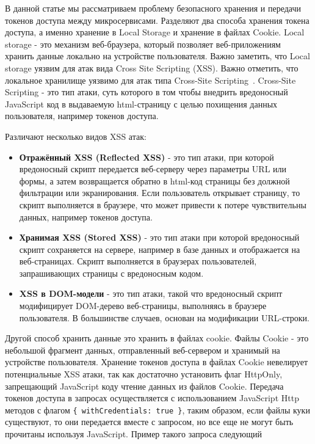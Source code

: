 В данной статье мы рассматриваем проблему безопасного хранения и передачи токенов доступа между микросервисами.
Разделяют два способа хранения токена доступа, а именно хранение в Local Storage и хранение в файлах Cookie.
Local storage - это механизм веб-браузера, который позволяет веб-приложениям хранить данные локально
на устройстве пользователя.
Важно заметить, что Local storage уязвим для атак вида Cross Site Scripting (XSS).
Важно отметить, что локальное хранилище уязвимо для атак типа Cross-Site Scripting~\cite{spett2005cross}.
Cross-Site Scripting - это тип атаки, суть которого в том чтобы внедрить вредоносный JavaScript код
в выдаваемую html-страницу с целью похищения данных пользователя, например токенов доступа.

Различают несколько видов XSS атак:
\begin{itemize}
    \item \textbf{Отражённый XSS (Reflected XSS)} - это тип атаки, при которой вредоносный
    скрипт передается веб-серверу через параметры URL или формы, а затем возвращается обратно в html-код страницы
    без должной фильтрации или экранирования.
    Если пользователь открывает страницу, то скрипт выполняется в браузере, что может привести к потере чувствительны данных, например токенов доступа.
    \item \textbf{Хранимая XSS (Stored XSS)} - это тип атаки при которой вредоносный скрипт сохраняется на сервере, например
    в базе данных и отображается на веб-страницах.
    Скрипт выполняется в браузерах пользователей, запрашивающих страницы с вредоносным кодом.
    \item \textbf{XSS в DOM-модели} - это тип атаки, такой что вредоносный скрипт модифицирует DOM-дерево веб-страницы,
    выполняясь в браузере пользователя.
    В большинстве случаев, основан на модификации URL-строки.
\end{itemize}

Другой способ хранить данные это хранить в файлах cookie.
Файлы Cookie - это небольшой фрагмент данных, отправленный веб-сервером и хранимый на устройстве пользователя.
Хранение токенов доступа в файлах Cookie невелирует потенциальные XSS атаки, так как достаточно установить флаг HttpOnly,
запрещающий JavaScript коду чтение данных из файлов Cookie.
Передача токенов доступа в запросах осуществляется с использованием JavaScript Http методов с флагом \texttt{\{ withCredentials: true \}},
таким образом, если файлы куки существуют, то они передается вместе с запросом, но все еще не могут быть прочитаны используя
JavaScript.
Пример такого запроса следующий


